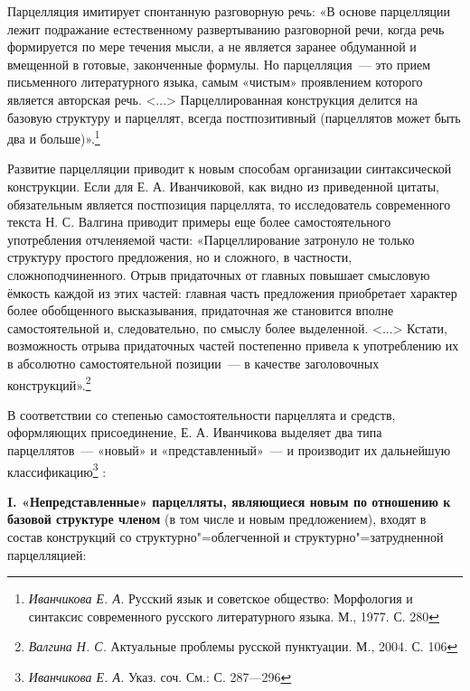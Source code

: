 \documentclass{kursa4}
\begin{document}
      {Парцелляция имитирует спонтанную разговорную речь: «В основе парцелляции лежит подражание естественному развертыванию разговорной речи, когда речь формируется по мере течения мысли, а не является заранее обдуманной и вмещенной в готовые, законченные формулы. Но парцелляция~--- это прием письменного литературного языка, самым «чистым» проявлением которого является авторская речь. \textless{}...\textgreater{} Парцеллированная конструкция делится на базовую структуру и парцеллят, }{всегда постпозитивный}{ (парцеллятов может быть два и больше)».}\footnote{\textit{{ Иванчикова Е. А. }}{Русский язык и советское общество: Морфология и синтаксис современного русского литературного языка. М., 1977.}\textit{{
      }}{С. 280}}{ }

      {Развитие парцелляции приводит к новым способам организации синтаксической конструкции. Если для Е. А. Иванчиковой, как видно из приведенной цитаты, обязательным является постпозиция парцеллята, то исследователь современного текста Н. С. Валгина приводит примеры еще более самостоятельного употребления отчленяемой части: «Парцеллирование затронуло не только структуру простого предложения, но и сложного, в частности, сложноподчиненного. Отрыв придаточных от главных повышает смысловую ёмкость каждой из этих частей: главная часть предложения }{приобретает характер более обо}{б}{щенного высказывания, придаточная же становится вполне самостоятельной и, следовательно, по смыслу более выделенной. \textless{}...\textgreater{} Кстати, возможность отрыва придаточных частей постепенно привела к употреблению их в абсолютно самостоятельной позиции~--- в качестве заголовочных конструкций».}\footnote{\textit{{ Валгина Н. С. }}{Актуальные проблемы русской пунктуации. М., 2004. С. 106}}{ }

      {В соответствии со степенью самостоятельности парцеллята и средств, оформляющих присоединение, Е. А. Иванчикова выделяет два типа парцеллятов~--- «новый» и «представленный»~--- и производит их дальнейшую классификацию}\footnote{\textit{{Иванчикова Е. А. }}{Указ. соч. См.: С. 287—296}}{ :}

      \textbf{I. «Непредставленные» парцелляты, являющиеся новым по отношению к базовой структуре членом} (в том числе и новым предложением), входят в состав конструкций со структурно"=облегченной и структурно"=затрудненной парцелляцией:
\end{document}
